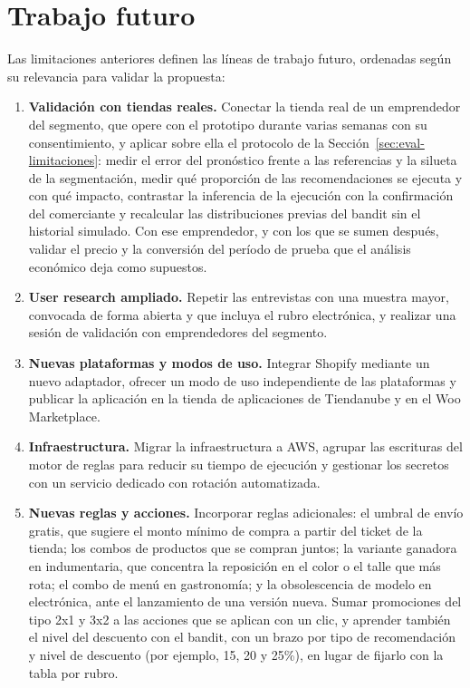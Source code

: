 \section{Trabajo futuro}
\label{sec:conclusiones-futuro}

Las limitaciones anteriores definen las líneas de trabajo futuro, ordenadas según su relevancia para validar la propuesta:

\begin{enumerate}
    \item \textbf{Validación con tiendas reales.} Conectar la tienda real de un emprendedor del segmento, que opere con el prototipo durante varias semanas con su consentimiento, y aplicar sobre ella el protocolo de la Sección~\ref{sec:eval-limitaciones}: medir el error del pronóstico frente a las referencias y la silueta de la segmentación, medir qué proporción de las recomendaciones se ejecuta y con qué impacto, contrastar la inferencia de la ejecución con la confirmación del comerciante y recalcular las distribuciones previas del bandit sin el historial simulado. Con ese emprendedor, y con los que se sumen después, validar el precio y la conversión del período de prueba que el análisis económico deja como supuestos.
    \item \textbf{User research ampliado.} Repetir las entrevistas con una muestra mayor, convocada de forma abierta y que incluya el rubro electrónica, y realizar una sesión de validación con emprendedores del segmento.
    \item \textbf{Nuevas plataformas y modos de uso.} Integrar Shopify mediante un nuevo adaptador, ofrecer un modo de uso independiente de las plataformas y publicar la aplicación en la tienda de aplicaciones de Tiendanube y en el Woo Marketplace.
    \item \textbf{Infraestructura.} Migrar la infraestructura a AWS, agrupar las escrituras del motor de reglas para reducir su tiempo de ejecución y gestionar los secretos con un servicio dedicado con rotación automatizada.
    \item \textbf{Nuevas reglas y acciones.} Incorporar reglas adicionales: el umbral de envío gratis, que sugiere el monto mínimo de compra a partir del ticket de la tienda; los combos de productos que se compran juntos; la variante ganadora en indumentaria, que concentra la reposición en el color o el talle que más rota; el combo de menú en gastronomía; y la obsolescencia de modelo en electrónica, ante el lanzamiento de una versión nueva. Sumar promociones del tipo 2x1 y 3x2 a las acciones que se aplican con un clic, y aprender también el nivel del descuento con el bandit, con un brazo por tipo de recomendación y nivel de descuento (por ejemplo, 15, 20 y 25\%), en lugar de fijarlo con la tabla por rubro.

\end{enumerate}

